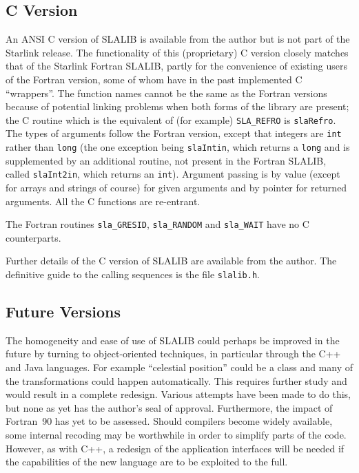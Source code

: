 \documentclass[11pt,twoside,nolof]{starlink}
\begin{document}
\subsection{C Version}
An ANSI C version of SLALIB is available from the author
but is not part of the Starlink release.
The functionality of this (proprietary) C version closely matches
that of the Starlink Fortran SLALIB, partly for the convenience of
existing users of the Fortran version, some of whom have in the past
implemented C ``wrappers''.  The function names
cannot be the same as the Fortran versions because of potential
linking problems when
both forms of the library are present; the C routine which
is the equivalent of (for example) \texttt{SLA\_REFRO} is \texttt{slaRefro}.
The types of arguments follow the Fortran version, except
that integers are \texttt{int} rather than \texttt{long} (the one
exception being
\texttt{slaIntin}, which returns a \texttt{long}
and is supplemented by an additional routine,
not present in the Fortran SLALIB, called \texttt{slaInt2in}, which returns
an \texttt{int}).
Argument passing is by value
(except for arrays and strings of course)
for given arguments and by pointer for returned arguments.
All the C functions are re-entrant.

The Fortran routines \texttt{sla\_GRESID}, \texttt{sla\_RANDOM} and
\texttt{sla\_WAIT} have no C counterparts.

Further details of the C version of SLALIB are available
from the author.  The definitive guide to
the calling sequences is the file \texttt{slalib.h}.

\subsection{Future Versions}
The homogeneity and ease of use of SLALIB could perhaps be improved
in the future by turning to object-oriented techniques, in particular
through the C++ and Java languages.  For example ``celestial
position'' could be a class and many of the transformations
could happen automatically.  This requires further study and
would result in a complete redesign.  Various attempts have been
made to do this, but none as yet has the author's seal of
approval.  Furthermore,
the impact of Fortran~90 has yet to be assessed.  Should compilers
become widely available, some internal recoding may be worthwhile
in order to simplify parts of the code.  However, as with C++,
a redesign of the
application interfaces will be needed if the capabilities of the
new language are to be exploited to the full.
\end{document}
